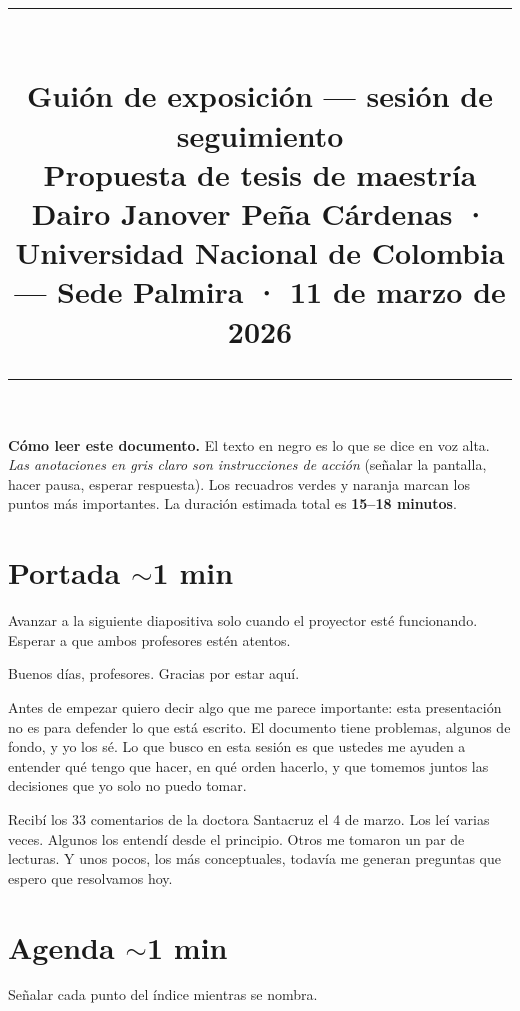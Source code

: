 \documentclass[11pt, letterpaper]{article}
\title{
  \vspace{-1cm}
  {\color{VerdeUNAL}\rule{\linewidth}{1.5pt}}\\[0.4cm]
  {\LARGE\bfseries Guión de exposición — sesión de seguimiento}\\[0.2cm]
  {\large Propuesta de tesis de maestría}\\[0.1cm]
  {\normalsize\color{GrisAnotacion}%
    Dairo Janover Peña Cárdenas \textbf{·}
    Universidad Nacional de Colombia — Sede Palmira \textbf{·}
    11 de marzo de 2026}\\[0.3cm]
  {\color{VerdeUNAL}\rule{\linewidth}{0.6pt}}
}
\author{}
\date{}
\newenvironment{accion}{%
  \par\smallskip
  \color{GrisAnotacion}\small\itshape\faHandPointRight\enspace
}{%
  \par\smallskip\normalcolor\normalsize\normalfont
}
\begin{document}
\maketitle
\thispagestyle{empty}

\begin{tcolorbox}[colback=GrisFondo, colframe=GrisClaro, arc=2mm]
  \small\textbf{Cómo leer este documento.}
  El texto en negro es lo que se dice en voz alta.
  {\color{GrisAnotacion}\itshape Las anotaciones en gris claro son instrucciones
  de acción} (señalar la pantalla, hacer pausa, esperar respuesta).
  Los recuadros verdes y naranja marcan los puntos más importantes.
  La duración estimada total es \textbf{15--18 minutos}.
\end{tcolorbox}

\bigskip

\section{Portada \hfill {\normalfont\small\color{GrisAnotacion}$\sim$1 min}}

\begin{accion}
  Avanzar a la siguiente diapositiva solo cuando el proyector esté
  funcionando. Esperar a que ambos profesores estén atentos.
\end{accion}

Buenos días, profesores. Gracias por estar aquí.

Antes de empezar quiero decir algo que me parece importante: esta presentación no es para defender lo que está escrito. El documento tiene problemas, algunos de fondo, y yo los sé. Lo que busco en esta sesión es que ustedes me ayuden a entender qué tengo que hacer, en qué orden hacerlo, y que tomemos juntos las decisiones que yo solo no puedo tomar.

Recibí los 33 comentarios de la doctora Santacruz el 4 de marzo. Los leí varias veces. Algunos los entendí desde el principio. Otros me tomaron un par de lecturas. Y unos pocos, los más conceptuales, todavía me generan preguntas que espero que resolvamos hoy.

\section{Agenda \hfill {\normalfont\small\color{GrisAnotacion}$\sim$1 min}}

\begin{accion}
  Señalar cada punto del índice mientras se nombra.
\end{accion}
\end{document}
